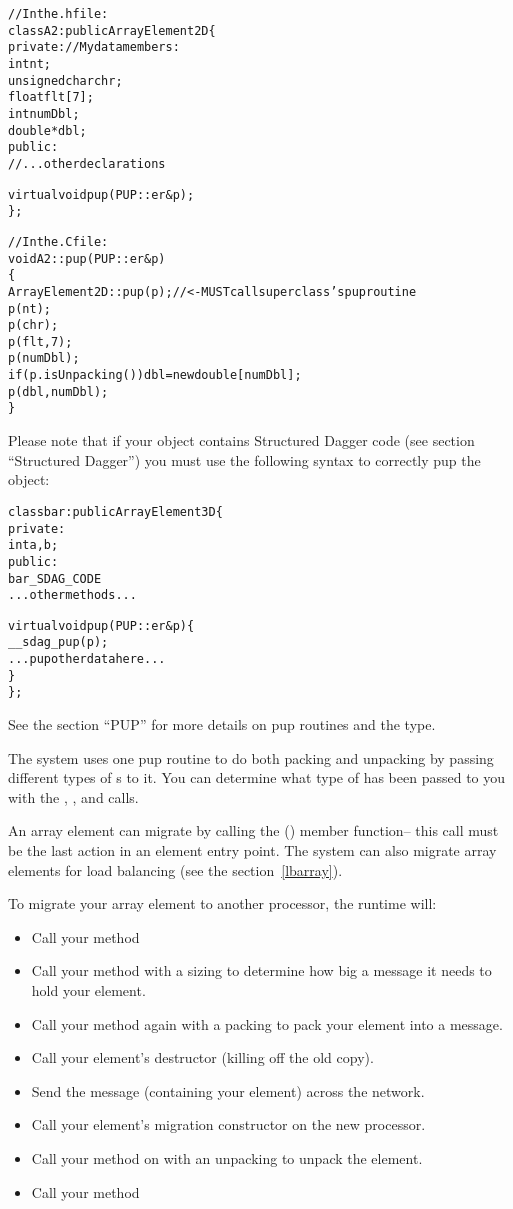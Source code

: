 \begin{alltt}
//In the .h file:
class A2:public ArrayElement2D \{
private: //My data members:
    int nt;
    unsigned char chr;
    float flt[7];
    int numDbl;
    double *dbl;
public:	
    //...other declarations

    virtual void pup(PUP::er \&p);
\};

//In the .C file:
void A2::pup(PUP::er \&p)
\{
    ArrayElement2D::pup(p); //<- MUST call superclass's pup routine
    p(nt);
    p(chr);
    p(flt,7);
    p(numDbl);
    if (p.isUnpacking()) dbl=new double[numDbl];
    p(dbl,numDbl);
\}
\end{alltt}

Please note that if your object contains Structured Dagger code (see section ``Structured Dagger'') you must use the following syntax to correctly pup the object:

\begin{alltt}
class bar: public ArrayElement3D \{
 private:
    int a,b;
 public:
    bar_SDAG_CODE 
    ...other methods...

    virtual void pup(PUP::er& p) \{
      __sdag_pup(p);
      ...pup other data here...
    \}
\};
\end{alltt}

See the  section ``PUP'' for more details on pup routines
and the  type.

The system uses one pup routine to do both packing and unpacking by
passing different types of s to it.  You can determine
what type of  has been passed to you with the
, , and  calls.

An array element can migrate by calling the () member function-- this call must be the last action
in an element entry point.  The system can also migrate array elements
for load balancing (see the section~\ref{lbarray}).

To migrate your array element to another processor, the \charmpp{}
runtime will:

\begin{itemize}
\item Call your  method
\item Call your  method with a sizing  to determine how 
big a message it needs to hold your element.
\item Call your  method again with a packing  to pack 
your element into a message.
\item Call your element's destructor (killing off the old copy).
\item Send the message (containing your element) across the network.
\item Call your element's migration constructor on the new processor.
\item Call your  method on with an unpacking  to unpack 
the element.
\item Call your  method
\end{itemize}


